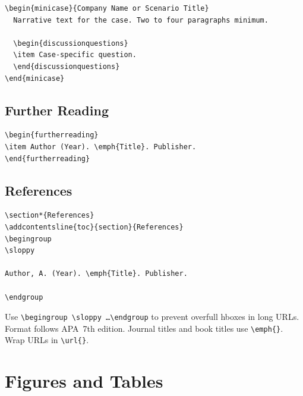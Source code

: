 \documentclass[11pt,openany]{book}
\newcommand{\code}[1]{\texttt{\small #1}}
\begin{document}
\begin{lstlisting}
\begin{minicase}{Company Name or Scenario Title}
  Narrative text for the case. Two to four paragraphs minimum.

  \begin{discussionquestions}
  \item Case-specific question.
  \end{discussionquestions}
\end{minicase}
\end{lstlisting}

\subsection{Further Reading}

\begin{lstlisting}
\begin{furtherreading}
\item Author (Year). \emph{Title}. Publisher.
\end{furtherreading}
\end{lstlisting}

\subsection{References}

\begin{lstlisting}
\section*{References}
\addcontentsline{toc}{section}{References}
\begingroup
\sloppy

Author, A. (Year). \emph{Title}. Publisher.

\endgroup
\end{lstlisting}

Use \code{\textbackslash begingroup \textbackslash sloppy \ldots \textbackslash endgroup} to prevent overfull hboxes in long URLs. Format follows APA~7th edition. Journal titles and book titles use \code{\textbackslash emph\{\}}. Wrap URLs in \code{\textbackslash url\{\}}.


\section{Figures and Tables}
\label{sec:figures-tables}
\end{document}
